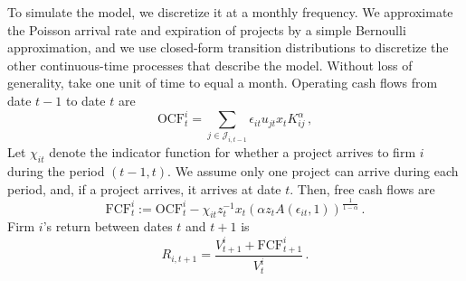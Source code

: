 \documentclass[12pt]{scrarticle}
\begin{document}
\begin{appendices}
To simulate the model, we discretize it at a monthly frequency. We approximate the Poisson arrival rate and expiration of projects by a simple Bernoulli approximation, and we use closed-form transition distributions to discretize the other continuous-time processes that describe the model. Without loss of generality, take one unit of time to equal a month. Operating cash flows from date $t-1$ to date $t$ are 
\[
\text{OCF}^i_t =
\sum_{j \in \mathcal J_{i, t-1}} \epsilon_{it} u_{jt} x_{t} K_{ij}^{\alpha}\, ,
\]
Let $\chi_{it}$ denote the indicator function for whether a project arrives to firm $i$ during the period $(t-1, t)$.  We assume only one project can arrive during each period, and, if a project arrives, it arrives at date $t$.  Then, free cash flows are
\[
\text{FCF}^i_t := \text{OCF}^i_t- \chi_{it}z_{t}^{-1} x_{t} (\alpha z_t A(\epsilon_{it}, 1))^{\frac{1}{1 - \alpha}}\,.
\]
Firm $i$'s return between dates $t$ and $t+1$ is
\begin{equation*}
R_{i,t+1} = \frac{V^i_{t+1} + \text{FCF}_{t+1}^i}{V^i_t}\,.
\end{equation*}


\end{appendices}
\end{document}
